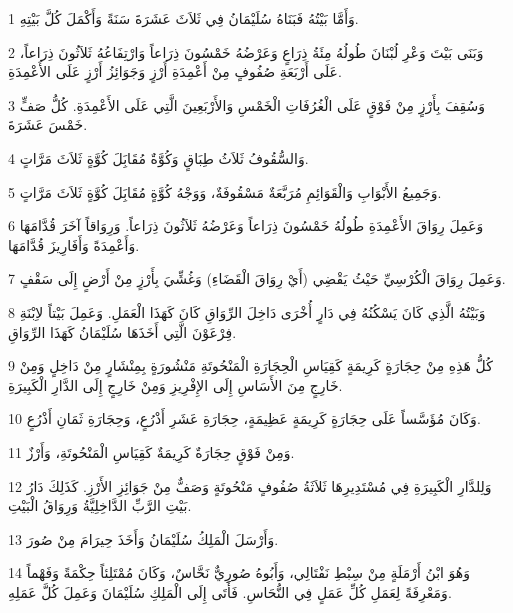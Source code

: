 \par 1 وَأَمَّا بَيْتُهُ فَبَنَاهُ سُلَيْمَانُ فِي ثَلاَثَ عَشَرَةَ سَنَةً وَأَكْمَلَ كُلَّ بَيْتِهِ.
\par 2 وَبَنَى بَيْتَ وَعْرِ لُبْنَانَ طُولُهُ مِئَةُ ذِرَاعٍ وَعَرْضُهُ خَمْسُونَ ذِرَاعاً وَارْتِفَاعُهُ ثَلاَثُونَ ذِرَاعاً، عَلَى أَرْبَعَةِ صُفُوفٍ مِنْ أَعْمِدَةِ أَرْزٍ وَجَوَائِزُ أَرْزٍ عَلَى الأَعْمِدَةِ.
\par 3 وَسُقِفَ بِأَرْزٍ مِنْ فَوْقٍ عَلَى الْغُرُفَاتِ الْخَمْسِ وَالأَرْبَعِينَ الَّتِي عَلَى الأَعْمِدَةِ. كُلُّ صَفٍّ خَمْسَ عَشَرَةَ.
\par 4 وَالسُّقُوفُ ثَلاَثُ طِبَاقٍ وَكُوَّةٌ مُقَابَِلَ كُوَّةٍ ثَلاَثَ مَرَّاتٍ.
\par 5 وَجَمِيعُ الأَبْوَابِ وَالْقَوَائِمِ مُرَبَّعَةٌ مَسْقُوفَةٌ، وَوَجْهُ كُوَّةٍ مُقَابَِلَ كُوَّةٍ ثَلاَثَ مَرَّاتٍ.
\par 6 وَعَمِلَ رِوَاقَ الأَعْمِدَةِ طُولُهُ خَمْسُونَ ذِرَاعاً وَعَرْضُهُ ثَلاَثُونَ ذِرَاعاً. وَرِوَاقاً آخَرَ قُدَّامَهَا وَأَعْمِدَةً وَأَفَارِيزَ قُدَّامَهَا.
\par 7 وَعَمِلَ رِوَاقَ الْكُرْسِيِّ حَيْثُ يَقْضِي (أَيْ رِوَاقَ الْقَضَاءِ) وَغُشِّيَ بِأَرْزٍ مِنْ أَرْضٍ إِلَى سَقْفٍ.
\par 8 وَبَيْتُهُ الَّذِي كَانَ يَسْكُنُهُ فِي دَارٍ أُخْرَى دَاخِلَ الرِّوَاقِ كَانَ كَهَذَا الْعَمَلِ. وَعَمِلَ بَيْتاً لاِبْنَةِ فِرْعَوْنَ الَّتِي أَخَذَهَا سُلَيْمَانُ كَهَذَا الرِّوَاقِ.
\par 9 كُلُّ هَذِهِ مِنْ حِجَارَةٍ كَرِيمَةٍ كَقِيَاسِ الْحِجَارَةِ الْمَنْحُوتَةِ مَنْشُورَةٍ بِمِنْشَارٍ مِنْ دَاخِلٍ وَمِنْ خَارِجٍ مِنَ الأَسَاسِ إِلَى الإِفْرِيزِ وَمِنْ خَارِجٍ إِلَى الدَّارِ الْكَبِيرَةِ.
\par 10 وَكَانَ مُؤَسَّساً عَلَى حِجَارَةٍ كَرِيمَةٍ عَظِيمَةٍ، حِجَارَةِ عَشَرِ أَذْرُعٍ، وَحِجَارَةِ ثَمَانِ أَذْرُعٍ.
\par 11 وَمِنْ فَوْقٍ حِجَارَةٌ كَرِيمَةٌ كَقِيَاسِ الْمَنْحُوتَةِ، وَأَرْزٌ.
\par 12 وَلِلدَّارِ الْكَبِيرَةِ فِي مُسْتَدِيرِهَا ثَلاَثَةُ صُفُوفٍ مَنْحُوتَةٍ وَصَفٌّ مِنْ جَوَائِزِ الأَرْزِ. كَذَلِكَ دَارُ بَيْتِ الرَّبِّ الدَّاخِلِيَّةُ وَرِوَاقُ الْبَيْتِ.
\par 13 وَأَرْسَلَ الْمَلِكُ سُلَيْمَانُ وَأَخَذَ حِيرَامَ مِنْ صُورَ.
\par 14 وَهُوَ ابْنُ أَرْمَلَةٍ مِنْ سِبْطِ نَفْتَالِي، وَأَبُوهُ صُورِيٌّ نَحَّاسٌ، وَكَانَ مُمْتَلِئاً حِكْمَةً وَفَهْماً وَمَعْرِفَةً لِعَمَلِ كُلِّ عَمَلٍ فِي النُّحَاسِ. فَأَتَى إِلَى الْمَلِكِ سُلَيْمَانَ وَعَمِلَ كُلَّ عَمَلِهِ.
